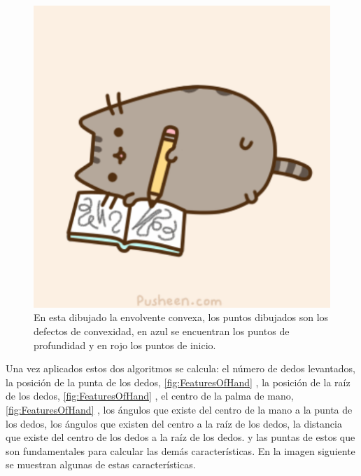 \begin{figure}[!h]
\begin{center}
\includegraphics[scale=.5]{./Figures/pusheen.png}
\end{center}
\caption{En esta dibujado la envolvente convexa, los puntos dibujados son los defectos de convexidad, en azul se encuentran los puntos de profundidad y en rojo los puntos de inicio.}
\label{fig:Convex&Defects}
\end{figure}


Una vez aplicados estos dos algoritmos se calcula: el número de dedos levantados, la posición de la punta de los dedos, \ref{fig:FeaturesOfHand} , la posición de la raíz de los dedos, \ref{fig:FeaturesOfHand} , el centro de la palma de mano, \ref{fig:FeaturesOfHand} , los ángulos que existe del centro de la mano a la punta de los dedos, los ángulos que existen del centro a la raíz de los dedos, la distancia que existe del centro de los dedos a la raíz de los dedos. y las puntas de estos que son fundamentales para calcular las demás características. En la imagen siguiente se muestran algunas de estas características.  

